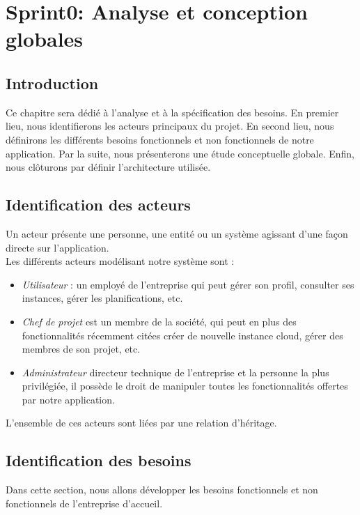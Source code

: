 \chapter{Sprint0: Analyse et conception globales }


\section{Introduction}
Ce chapitre sera dédié à l'analyse et à la spécification des besoins. 
En premier lieu, nous identifierons les acteurs principaux du projet. En second lieu, nous définirons les différents besoins fonctionnels et non fonctionnels de notre application. 
Par la suite, nous présenterons une étude conceptuelle globale. Enfin, nous clôturons par définir l'architecture utilisée.


\section{Identification des acteurs}
Un acteur présente une personne, une entité ou un système  agissant d'une façon directe sur l'application.\\
Les différents acteurs modélisant notre système sont :
\begin{itemize}
	\item  \textit{Utilisateur} : un employé de l'entreprise qui peut gérer son profil, consulter ses instances, gérer les planifications, etc.
	\item  \textit{Chef de projet}  est un membre de la société, qui peut en plus des fonctionnalités récemment citées créer de nouvelle instance cloud, gérer des membres de son projet, etc.
	\item  \textit{Administrateur}  directeur technique de l'entreprise et la personne la plus privilégiée, il possède le droit de manipuler toutes les fonctionnalités offertes par notre application.
\end{itemize}
L'ensemble de ces acteurs sont liées par une relation d'héritage. 
\section{Identification des besoins}
Dans cette section, nous allons développer les besoins fonctionnels et non fonctionnels de l'entreprise d'accueil.
